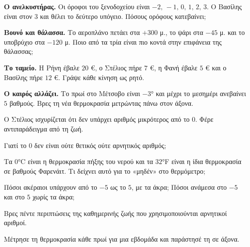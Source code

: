 \ex \textbf{Ο ανελκυστήρας.} Οι όροφοι του ξενοδοχείου είναι $-2,\,-1,\,0,\,1,\,2,\,3$. Ο Βασίλης είναι στον $3$ και θέλει το δεύτερο υπόγειο. Πόσους ορόφους κατεβαίνει;

\ex \textbf{Βουνό και θάλασσα.} Το αεροπλάνο πετάει στα $+300$ μ., το ψάρι στα $-45$ μ. και το υποβρύχιο στα $-120$ μ. Ποιο από τα τρία είναι πιο κοντά στην επιφάνεια της θάλασσας;

\ex \textbf{Το ταμείο.} Η Ρήνη έβαλε $20$ €, ο Στέλιος πήρε $7$ €, η Φανή έβαλε $5$ € και ο Βασίλης πήρε $12$ €. Γράψε κάθε κίνηση ως ρητό.

\ex \textbf{Ο καιρός αλλάζει.} Το πρωί στο Μέτσοβο είναι $-3$° και μέχρι το μεσημέρι ανεβαίνει $5$ βαθμούς. Βρες τη νέα θερμοκρασία μετρώντας πάνω στον άξονα.


\ex Ο Στέλιος ισχυρίζεται ότι δεν υπάρχει αριθμός μικρότερος από το $0$. Φέρε αντιπαράδειγμα από τη ζωή.

\ex Γιατί το $0$ δεν είναι ούτε θετικός ούτε αρνητικός αριθμός;

\ex Τα $0$°C είναι η θερμοκρασία πήξης του νερού και τα $32$°F είναι η ίδια θερμοκρασία σε βαθμούς Φαρενάιτ. Τι δείχνει αυτό για το «μηδέν» στο θερμόμετρο;

\ex Πόσοι ακέραιοι υπάρχουν από το $-5$ ως το $5$, με τα άκρα; Πόσοι ανάμεσα στο $-5$ και στο $5$ χωρίς τα άκρα;


\ex Βρες πέντε περιπτώσεις της καθημερινής ζωής που χρησιμοποιούνται αρνητικοί αριθμοί.

\ex Μέτρησε τη θερμοκρασία κάθε πρωί για μια εβδομάδα και παράστησέ τη σε άξονα.
